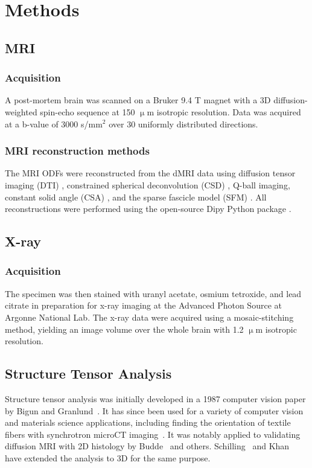 \documentclass[11pt]{article}
\begin{document}
\section{Methods}
\subsection{MRI}
\subsubsection{Acquisition}
A post-mortem brain was scanned on a Bruker 9.4 T magnet with a 3D
diffusion-weighted spin-echo sequence at 150 $\upmu$m isotropic
resolution. Data was acquired at a b-value of 3000 s/mm$^2$ over 30 uniformly
distributed directions.

\subsubsection{MRI reconstruction methods}
The MRI ODFs were reconstructed from the dMRI data using diffusion tensor
imaging (DTI) \cite{Basser1994}, constrained spherical deconvolution (CSD)
\cite{Tournier2004}, Q-ball imaging, constant solid angle (CSA)
\cite{Aganj2010}, and the sparse fascicle model (SFM) \cite{Rokem2015}. All
reconstructions were performed using the open-source Dipy Python package
\cite{Garyfallidis2014}.

\subsection{X-ray}
\subsubsection{Acquisition}
The specimen was then stained with uranyl acetate,
osmium tetroxide, and lead citrate in preparation for x-ray imaging at the
Advanced Photon Source at Argonne National Lab. The x-ray data were acquired
using a mosaic-stitching method, yielding an image volume over the whole brain
with 1.2 $\upmu$m isotropic resolution.


\subsection{Structure Tensor Analysis}
Structure tensor analysis was initially developed in a 1987 computer vision
paper by Bigun and Granlund~\cite{Bigun1987}. It has since been used for a
variety of computer vision and materials science applications, including finding
the orientation of textile fibers with synchrotron microCT
imaging~\cite{Straumit2015}. It was notably applied to validating diffusion MRI
with 2D histology by Budde~\cite{Budde2012,Budde2013} and
others. Schilling~\cite{Schilling2016,Schilling2018} and Khan~\cite{Khan2015}
have extended the analysis to 3D for the same purpose.
\end{document}
